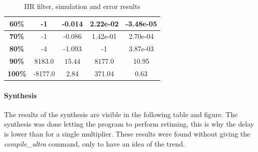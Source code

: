 \documentclass[a4paper]{article}
\begin{document}
\begin{table}[hbtp]
\begin{tabular}{|c|c|c|c|c|}
		\textbf{60\%}                                                                   & 		-1                                                                              & 		-0.014                                                                           & 2.22e-02                             &		 -3.48e-05                             \\ \hline
		\textbf{70\%}                                                                   & 		-1                                                                              & 		-0.086                                                                           & 1.42e-01                             &		 2.70e-04                              \\ \hline
		\textbf{80\%}                                                                   & 		-4                                                                              & 		-1.093                                                                           & -1                                   &		 3.87e-03                              \\ \hline
		\textbf{90\%}                                                                   & 		8183.0                                                                          & 		15.44                                                                            & 8177.0                               &		 10.95                                 \\ \hline
		\textbf{100\%}                                                                  & 		-8177.0                                                                         & 		2.84                                                                             & 371.04                               &		 0.63                                  \\ \hline
		\end{tabular}
		\caption{IIR filter, simulation and error results}
		\label{tab:iir_sim}
	\end{table}

	\paragraph*{Synthesis} The results of the synthesis are visible in the following table and figure. The synthesis was done letting the program to perform retiming, this is why the delay is lower than for a single multiplier. These results were found without giving the \textit{compile\_ultra} command, only to have an idea of the trend.
\end{document}
